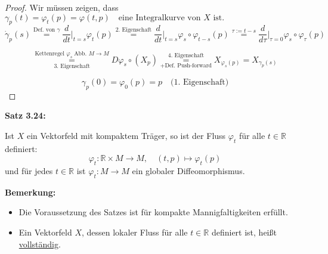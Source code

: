 \documentclass[fleqn, 12pt, letterpaper]{article}
\newcommand{\txt}[1]{\text{#1}}
\begin{document}
\begin{proof}
    Wir müssen zeigen, dass 
\(\gamma_p(t) = \varphi_t(p) = \varphi(t, p) \quad \text{eine Integralkurve von } X \text{ ist.}\)
\[
\dot{\gamma}_p(s) \overset{\txt{Def. von }\gamma}{=} \frac{d}{dt} \big|_{t = s}\varphi_t(p) \overset{\txt{2. Eigenschaft}}{=} \frac{d}{dt} \big|_{t = s} \varphi_s\circ\varphi_{t-s}(p)\overset{\tau:=t-s}{=} \frac{d}{d\tau} \big|_{\tau = 0}\varphi_s\circ\varphi_\tau(p)
\]

\[
\underset{\txt{3. Eigenschaft}}{\overset{\txt{Kettenregel }\varphi_s \;\txt{Abb. } M\rightarrow M}{=}}D\varphi_s\circ(X_p) \underset{+ \txt{Def. Push-forward}}{\overset{\txt{4. Eigenschaft}}{=}} X_{\varphi_s(p)}=X_{\gamma_p(s)}
\]

\[
\gamma_p(0) = \varphi_0(p) = p 
\quad \text{(1. Eigenschaft)}
\]
\end{proof}

\textbf{Satz 3.24:}

Ist $X$ ein Vektorfeld mit kompaktem Träger, so ist der Fluss $\varphi_t$ für alle $t \in \mathbb{R}$ definiert:
\[
\varphi_t: \mathbb{R} \times M \longrightarrow M, \quad (t, p) \longmapsto \varphi_t(p)
\]
und für jedes $t \in \mathbb{R}$ ist $\varphi_t: M \longrightarrow M$ ein globaler Diffeomorphismus.\\

\vspace{1em}

\textbf{Bemerkung:} 
\begin{itemize}
    \item Die Voraussetzung des Satzes ist für kompakte Mannigfaltigkeiten erfüllt.
    \item Ein Vektorfeld $X$, dessen lokaler Fluss für alle $t \in \mathbb{R}$ definiert ist, heißt \underline{vollständig}.
\end{itemize}
\end{document}
